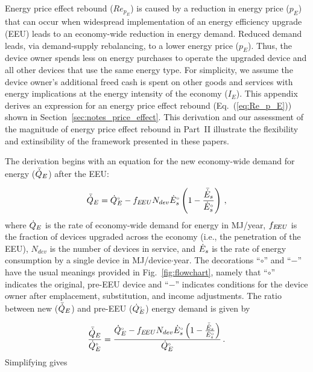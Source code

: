 

Energy price effect rebound ($Re_{p_E}$) is caused by a reduction 
in energy price ($p_E$)
that can occur when widespread implementation 
of an energy efficiency upgrade (EEU)
leads to an economy-wide reduction in energy demand.
Reduced demand leads,
via demand-supply rebalancing, 
to a lower energy price ($p_E$).
Thus, the device owner spends less on energy purchases
to operate the upgraded device
and all other devices that use the same energy type.
For simplicity, 
we assume the device owner's additional freed cash
is spent on other goods and services
with energy implications 
at the energy intensity of the economy ($I_E$).
This appendix derives an expression for an
energy price effect rebound (Eq.~(\ref{eq:Re_p_E}))
shown in Section~\ref{sec:notes_price_effect}.
This derivation and our assessment 
of the magnitude of energy price effect rebound
in Part~II
illustrate the flexibility and extinsibility of the framework
presented in these papers.

The derivation begins with an equation for the new economy-wide 
demand for energy ($\bar{\dot{Q}}_E$) after the EEU:

\begin{equation}
  \bar{\dot{Q}}_E = {}{\dot{Q}}^{\scriptscriptstyle \circ}_E - f_{E\!EU} N_{dev} {}{\dot{E}}^{\scriptscriptstyle \circ}_s \left( 1 - \frac{\bar{\dot{E}}_s}{{}{\dot{E}}^{\scriptscriptstyle \circ}_s} \right) \, ,
\end{equation}
%
where
$\dot{Q}_E$ is the rate of economy-wide demand for energy in MJ/year,
$f_{E\!EU}$ is the fraction of devices upgraded across the economy
(i.e., the penetration of the EEU),
$N_{dev}$ is the number of devices in service, and
$\dot{E}_s$ is the rate of energy consumption by a single device in MJ/device$\cdot$year.
The decorations ``$\circ$'' and ``$-$'' have the usual meanings
provided in Fig.~\ref{fig:flowchart}, namely that
``$\circ$'' indicates the original, pre-EEU device and
``$-$'' indicates conditions for the device owner after
emplacement, substitution, and income
adjustments.
The ratio between
new ($\bar{\dot{Q}}_E$) and
pre-EEU (${}{\dot{Q}}^{\scriptscriptstyle \circ}_E$)
energy demand is given by

\begin{equation}
  \frac{\bar{\dot{Q}}_E}{{}{\dot{Q}}^{\scriptscriptstyle \circ}_E} =
        \frac{{}{\dot{Q}}^{\scriptscriptstyle \circ}_E - f_{E\!EU} N_{dev} {}{\dot{E}}^{\scriptscriptstyle \circ}_s \left( 1 - \frac{\bar{\dot{E}}_s}{{}{\dot{E}}^{\scriptscriptstyle \circ}_s}  \right)}
        {{}{\dot{Q}}^{\scriptscriptstyle \circ}_E} \, .
\end{equation}
%
Simplifying gives

